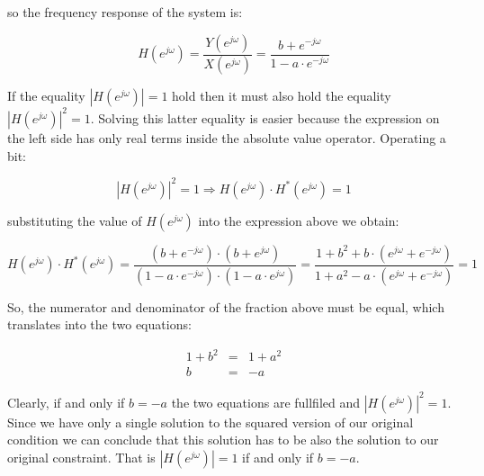 \documentclass[a4paper,11pt,oneside]{article}
\begin{document}
so the frequency response of the system is:

\[
H(e^{j\omega})=\frac{Y(e^{j\omega})}{X(e^{j\omega})}=\frac{b+e^{-j\omega}}{1-a\cdot e^{-j\omega}}
\]

If the equality $|H(e^{j\omega})|=1$ hold then it must also hold the equality $|H(e^{j\omega})|^2=1$. Solving this latter equality is easier because the expression on the left side has only real terms inside the absolute value operator. Operating a bit:

\[
|H(e^{j\omega})|^2=1 \Longrightarrow H(e^{j\omega})\cdot H^*(e^{j\omega})=1
\]

substituting the value of $H(e^{j\omega})$ into the expression above we obtain:

\[
H(e^{j\omega})\cdot H^*(e^{j\omega})=\frac{(b+e^{-j\omega})\cdot (b+e^{j\omega})}{(1-a\cdot e^{-j\omega})\cdot(1-a\cdot e^{j\omega})}=\frac{1+b^2+b\cdot(e^{j\omega}+e^{-j\omega})}{1+a^2-a\cdot(e^{j\omega}+e^{-j\omega})}=1
\]

So, the numerator and denominator of the fraction above must be equal, which translates into the two equations:

\[
\begin{array}{lll}
1+b^2&=&1+a^2\\
b &=& -a
\end{array}
\]

Clearly, if and only if $b=-a$ the two equations are fullfiled and $|H(e^{j\omega})|^2=1$. Since we have only a single solution to the squared version of our original condition we can conclude that this solution has to be also the solution to our original constraint. That is $|H(e^{j\omega})|=1$ if and only if $b=-a$.

\vspace{1cm}
\end{document}
